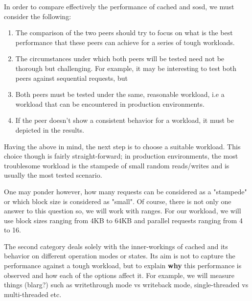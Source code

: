 In order to compare effectively the performance of cached and sosd, we must 
consider the following: 

\begin{enumerate}
	\item The comparison of the two peers should try to focus on what is 
		the best performance that these peers can achieve for a series 
		of tough workloads.
	\item The circumstances under which both peers will be tested need not 
		be thorough but challenging. For example, it may be interesting 
		to test both peers against sequential requests, but
		
	\item Both peers must be tested under the same, reasonable workload, 
		i.e a workload that can be encountered in production 
		environments.
	\item If the peer doesn't show a consistent behavior for a workload, it 
		must be depicted in the results.
\end{enumerate}

Having the above in mind, the next step is to choose a suitable workload.  This 
choice though is fairly straight-forward; in production environments, the most 
troublesome workload is the stampede of small random reads/writes and is 
usually the most tested scenario.  

One may ponder however, how many requests can be considered as a "stampede" or 
which block size is considered as "small". Of course, there is not only one 
answer to this question so, we will work with ranges. For our workload, we will 
use block sizes ranging from 4KB to 64KB and parallel requests ranging from 4 
to 16.

The second category deals solely with the inner-workings of cached and its 
behavior on different operation modes or states. Its aim is not to capture the 
performance against a tough workload, but to explain \textbf{why} this 
performance is observed and how each of the options affect it. For example, we 
will measure things (blarg?) such as writethrough mode vs writeback mode, 
single-threaded vs multi-threaded etc.

